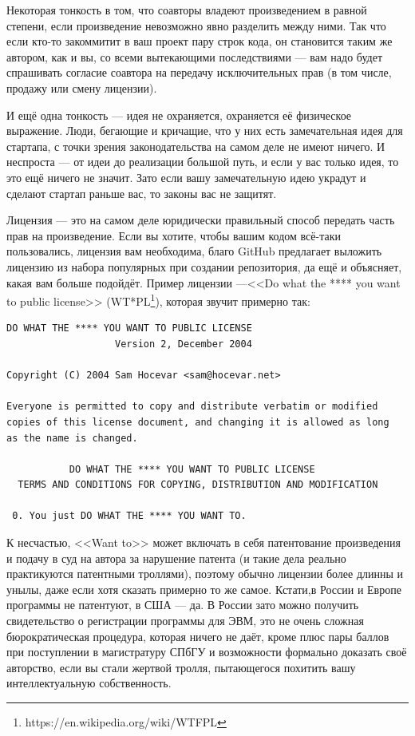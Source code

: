 \documentclass{../../text-style}
\begin{document}
Некоторая тонкость в том, что соавторы владеют произведением в равной степени, если произведение невозможно явно разделить между ними. Так что если кто-то закоммитит в ваш проект пару строк кода, он становится таким же автором, как и вы, со всеми вытекающими последствиями --- вам надо будет спрашивать согласие соавтора на передачу исключительных прав (в том числе, продажу или смену лицензии).

И ещё одна тонкость --- идея не охраняется, охраняется её физическое выражение. Люди, бегающие и кричащие, что у них есть замечательная идея для стартапа, с точки зрения законодательства на самом деле не имеют ничего. И неспроста --- от идеи до реализации большой путь, и если у вас только идея, то это ещё ничего не значит. Зато если вашу замечательную идею украдут и сделают стартап раньше вас, то законы вас не защитят.

Лицензия --- это на самом деле юридически правильный способ передать часть прав на произведение. Если вы хотите, чтобы вашим кодом всё-таки пользовались, лицензия вам необходима, благо GitHub предлагает выложить лицензию из набора популярных при создании репозитория, да ещё и объясняет, какая вам больше подойдёт. Пример лицензии ---<<Do what the **** you want to public license>> (WT*PL\footnote{https://en.wikipedia.org/wiki/WTFPL}), которая звучит примерно так:
\begin{verbatim}
DO WHAT THE **** YOU WANT TO PUBLIC LICENSE
                   Version 2, December 2004
 
Copyright (C) 2004 Sam Hocevar <sam@hocevar.net>

Everyone is permitted to copy and distribute verbatim or modified
copies of this license document, and changing it is allowed as long
as the name is changed.
 
           DO WHAT THE **** YOU WANT TO PUBLIC LICENSE
  TERMS AND CONDITIONS FOR COPYING, DISTRIBUTION AND MODIFICATION

 0. You just DO WHAT THE **** YOU WANT TO.
 \end{verbatim}

К несчастью, <<Want to>> может включать в себя патентование произведения и подачу в суд на автора за нарушение патента (и такие дела реально практикуются патентными троллями), поэтому обычно лицензии более длинны и унылы, даже если хотя сказать примерно то же самое. Кстати,в России и Европе программы не патентуют, в США --- да. В России зато можно получить свидетельство о регистрации программы для ЭВМ, это не очень сложная бюрократическая процедура, которая ничего не даёт, кроме плюс пары баллов при поступлении в магистратуру СПбГУ и возможности формально доказать своё авторство, если вы стали жертвой тролля, пытающегося похитить вашу интеллектуальную собственность.
\end{document}
